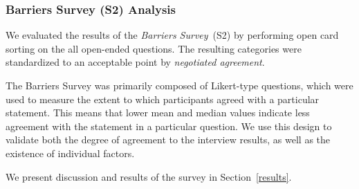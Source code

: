 \subsubsection{Barriers Survey (S2) Analysis}

We evaluated the results of the \textit{Barriers Survey}~(S2) by performing open card sorting on the all open-ended questions.
The resulting categories were standardized to an acceptable point by \textit{negotiated agreement}.

The Barriers Survey was primarily composed of Likert-type questions, which were used to measure the extent to which participants agreed with a particular statement.
This means that lower mean and median values indicate less agreement with the statement in a particular question.
We use this design to validate both the degree of agreement to the interview results, as well as the existence of individual factors.

We present discussion and results of the survey in Section~\ref{results}. 